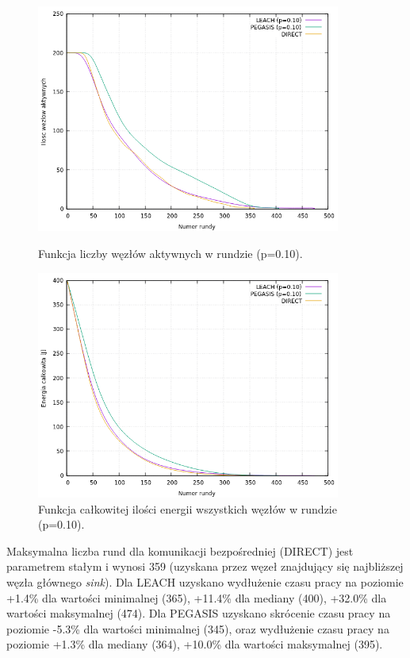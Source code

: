 \documentclass[a4paper,12pt,twoside,openany]{report}
\begin{document}
\begin{figure}[H]
 \centering
 \includegraphics[width=10cm]{images/gnuplot/test_4/nodes_in_round_p010.png}
 \caption{Funkcja liczby węzłów aktywnych w rundzie (p=0.10).}
 \includegraphics[width=10cm]{images/gnuplot/test_4/energy_in_round_p010.png}
 \caption{Funkcja całkowitej ilości energii wszystkich węzłów w rundzie (p=0.10).}
\end{figure}

\par
Maksymalna liczba rund dla komunikacji bezpośredniej (DIRECT) jest parametrem stałym i wynosi 359 (uzyskana przez węzeł znajdujący się najbliższej węzła głównego \textit{sink}).
Dla LEACH uzyskano wydłużenie czasu pracy na poziomie +1.4\% dla wartości minimalnej (365), +11.4\% dla mediany (400), +32.0\% dla wartości maksymalnej (474).
Dla PEGASIS uzyskano skrócenie czasu pracy na poziomie -5.3\% dla wartości minimalnej (345), oraz wydłużenie czasu pracy na poziomie +1.3\% dla mediany (364), +10.0\% dla wartości maksymalnej (395).
\end{document}
